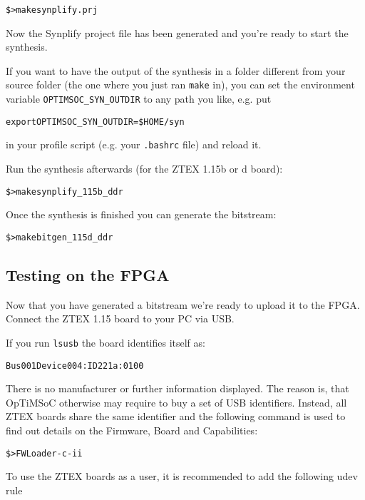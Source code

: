 \begin{alltt}
\$> make synplify.prj
\end{alltt}

Now the Synplify project file has been generated and you're ready to start the
synthesis.

If you want to have the output of the synthesis in a folder different from your
source folder (the one where you just ran \verb|make| in), you can set the
environment variable \verb|OPTIMSOC_SYN_OUTDIR| to any path you like, e.g. put
\begin{alltt}
export OPTIMSOC_SYN_OUTDIR=\$HOME/syn
\end{alltt}
in your profile script (e.g. your \verb|.bashrc| file) and reload it.

Run the synthesis afterwards (for the ZTEX 1.15b or d board):

\begin{alltt}
\$> make synplify_115b_ddr
\end{alltt}

Once the synthesis is finished you can generate the bitstream:

\begin{alltt}
\$> make bitgen_115d_ddr
\end{alltt}

\subsection{Testing on the FPGA}
Now that you have generated a bitstream we're ready to upload it to the FPGA.
Connect the ZTEX 1.15 board to your PC via USB.

If you run \verb|lsusb| the board identifies itself as:

\begin{alltt}
Bus 001 Device 004: ID 221a:0100  
\end{alltt}

There is no manufacturer or further information displayed. The reason
is, that OpTiMSoC otherwise may require to buy a set of USB
identifiers. Instead, all ZTEX boards share the same identifier and
the following command is used to find out details on the Firmware,
Board and Capabilities:

\begin{alltt}
\$> FWLoader -c -ii
\end{alltt}

To use the ZTEX boards as a user, it is recommended to add the following
udev rule

